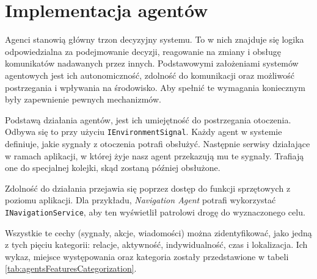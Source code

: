 \section{Implementacja agentów}
\label{sec:implementacjaAgentow} 

\par Agenci stanowią główny trzon decyzyjny systemu. To w nich znajduje się logika odpowiedzialna za podejmowanie decyzji, reagowanie na zmiany i obsługę komunikatów nadawanych przez innych. Podstawowymi założeniami systemów agentowych jest ich autonomiczność, zdolność do komunikacji oraz możliwość postrzegania i wpływania na środowisko. Aby spełnić te wymagania koniecznym były zapewnienie pewnych mechanizmów.

\par Podstawą działania agentów, jest ich umiejętność do postrzegania otoczenia. Odbywa się to przy użyciu \texttt{IEnvironmentSignal}. Każdy agent w systemie definiuje, jakie sygnały z otoczenia potrafi obsłużyć. Następnie serwisy działające w ramach aplikacji, w której żyje nasz agent przekazują mu te sygnały. Trafiają one do specjalnej kolejki, skąd zostaną później obsłużone.

\par Zdolność do działania przejawia się poprzez dostęp do funkcji sprzętowych z poziomu aplikacji. Dla przykładu, \emph{Navigation Agent} potrafi wykorzystać \texttt{INavigationService}, aby ten wyświetlił patrolowi drogę do wyznaczonego celu.

\par Wszystkie te cechy (sygnały, akcje, wiadomości) można zidentyfikować, jako jedną z tych pięciu kategorii: relacje, aktywność, indywidualność, czas i lokalizacja. Ich wykaz, miejsce występowania oraz kategoria zostały przedstawione w tabeli \ref{tab:agentsFeaturesCategorization}.

